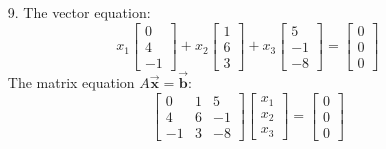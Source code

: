 \documentclass[12pt]{article}
\newcommand{\vect}[1]{\Vec{\textbf{#1}}}
\theoremstyle{definition}
\begin{document}
{\begin{enumerate}
    \item[9.] 
    The vector equation:
    \[
    x_1 \begin{bmatrix} 0 \\ 4 \\ -1 \end{bmatrix} + x_2 \begin{bmatrix} 1 \\ 6 \\ 3 \end{bmatrix} + x_3 \begin{bmatrix} 5 \\ -1 \\ -8 \end{bmatrix} = \begin{bmatrix} 0 \\ 0 \\ 0 \end{bmatrix}
    \]
    The matrix equation $A \vect{x} = \vect{b}$:
    \[
    \begin{bmatrix} 
    0 & 1 & 5 \\
    4 & 6 & -1 \\
    -1 & 3 & -8
    \end{bmatrix}
    \begin{bmatrix} 
    x_1 \\ x_2 \\ x_3
    \end{bmatrix} = 
    \begin{bmatrix} 
    0 \\ 0 \\ 0
    \end{bmatrix}
    \]
    

\end{enumerate}}
\end{document}

